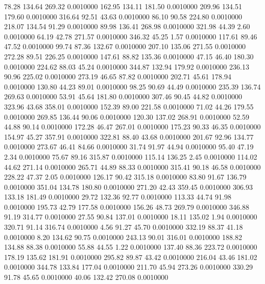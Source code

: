   78.28  134.64  269.32   0.0010000
 162.95  134.11  181.50   0.0010000
 209.96  134.51  179.60   0.0010000
 316.64   92.51   43.63   0.0010000
  86.10   90.58  224.80   0.0010000
 218.07  134.54   91.29   0.0010000
  89.98  136.41  268.98   0.0010000
 321.98   44.39    2.60   0.0010000
  64.19   42.78  271.57   0.0010000
 346.32   45.25    1.57   0.0010000
 117.61   89.46   47.52   0.0010000
  99.74   87.36  132.67   0.0010000
 207.10  135.06  271.55   0.0010000
 272.28   89.51  226.25   0.0010000
 147.61   88.82  135.36   0.0010000
  47.15   46.40  180.30   0.0010000
 224.62   88.03   45.24   0.0010000
 344.87  132.94  179.92   0.0010000
 236.13   90.96  225.02   0.0010000
 273.19   46.65   87.82   0.0010000
 202.71   45.61  178.94   0.0010000
 130.80   44.23   89.01   0.0010000
  98.25   90.69   44.49   0.0010000
 235.39  136.74  269.63   0.0010000
  53.91   45.64  181.80   0.0010000
 307.46   90.45   44.82   0.0010000
 323.96   43.68  358.01   0.0010000
 152.39   89.00  221.58   0.0010000
  71.02   44.26  179.55   0.0010000
 269.85  136.44   90.06   0.0010000
 120.30  137.02  268.91   0.0010000
  52.59   44.88   90.14   0.0010000
 172.28   46.47  267.01   0.0010000
 175.23   90.33   46.35   0.0010000
 154.97   45.27  357.91   0.0010000
 322.81   88.40   43.68   0.0010000
 201.67   92.96  134.77   0.0010000
 273.67   46.41   84.66   0.0010000
  31.74   91.97   44.94   0.0010000
  95.40   47.19    2.34   0.0010000
  75.67   89.16  315.87   0.0010000
 115.14  136.25    2.45   0.0010000
 114.02   44.62  271.14   0.0010000
 265.71   44.89   88.33   0.0010000
 315.41   90.18   46.58   0.0010000
 228.22   47.37    2.05   0.0010000
 126.17   90.42  315.18   0.0010000
  83.80   91.67  136.79   0.0010000
 351.04  134.78  180.80   0.0010000
 271.20   42.43  359.45   0.0010000
 306.93  133.18  181.49   0.0010000
  29.72  132.36   92.77   0.0010000
 113.33   44.74   91.98   0.0010000
 195.73   42.79  177.58   0.0010000
 156.26   48.73  269.79   0.0010000
 346.88   91.19  314.77   0.0010000
  27.55   90.84  137.01   0.0010000
  18.11  135.02    1.94   0.0010000
 320.71   91.14  316.74   0.0010000
   4.56   91.27   45.70   0.0010000
 332.19   88.37   41.18   0.0010000
   8.20  134.62   90.75   0.0010000
 243.13   90.01  316.01   0.0010000
 188.82  134.88   88.38   0.0010000
  55.88   44.55    1.22   0.0010000
 137.40   88.36  223.72   0.0010000
 178.19  135.62  181.91   0.0010000
 295.82   89.87   43.42   0.0010000
 216.04   43.46  181.02   0.0010000
 344.78  133.84  177.04   0.0010000
 211.70   45.94  273.26   0.0010000
 330.29   91.78   45.65   0.0010000
  40.06  132.42  270.08   0.0010000
